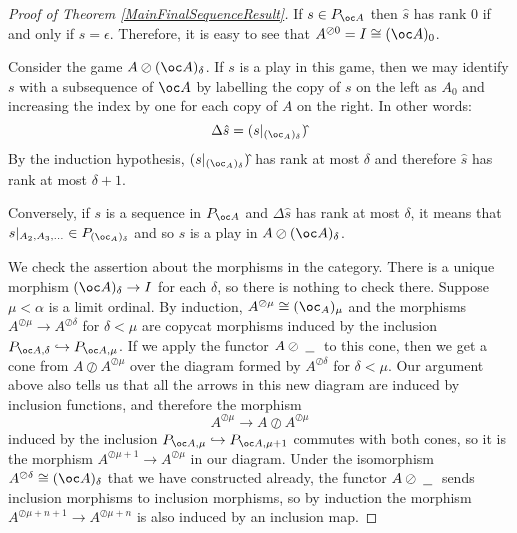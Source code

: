 \documentclass[11pt]{article} %
\theoremstyle{plain} %
\theoremstyle{definition} %
\theoremstyle{note}
\theoremstyle{exercisestyle}
\newcommand{\sequoid}{\oslash}
\newcommand{\emptyplay}{\epsilon}
\newcommand{\blank}{\;\underline{\hspace{1.5ex}}\;}
\begin{document}
\begin{proof}[Proof of Theorem \ref{MainFinalSequenceResult}]
  If $s\in P_{\oc A}$ then $\hat s$ has rank $0$ if and only if $s=\emptyplay$.  Therefore, it is easy to see that $A^{\sequoid 0}=I\cong(\oc A)_0$.  

  Consider the game $A\sequoid (\oc A)_\delta$.  If $s$ is a play in this game, then we may identify $s$ with a subsequence of $\oc A$ by labelling the copy of $s$ on the left as $A_0$ and increasing the index by one for each copy of $A$ on the right.  In other words:
  \[
    \Delta\hat s = ({s\vert_{(\oc_A)_\delta}})\hat{}
    \]
  By the induction hypothesis, $({s\vert_{(\oc_A)_\delta}})\hat{}$ has rank at most $\delta$ and therefore $\hat s$ has rank at most $\delta+1$.  

  Conversely, if $s$ is a sequence in $P_{\oc A}$ and $\Delta\hat s$ has rank at most $\delta$, it means that $s\vert_{A_2,A_3,\dots}\in P_{(\oc_A)_\delta}$ and so $s$ is a play in $A\sequoid(\oc A)_\delta$.  

  We check the assertion about the morphisms in the category.  There is a unique morphism $(\oc A)_\delta\to I$ for each $\delta$, so there is nothing to check there.  Suppose $\mu<\alpha$ is a limit ordinal.  By induction, $A^{\sequoid\mu}\cong (\oc_A)_\mu$ and the morphisms $A^{\sequoid\mu}\to A^{\sequoid\delta}$ for $\delta<\mu$ are copycat morphisms induced by the inclusion $P_{\oc A, \delta}\hookrightarrow P_{\oc A,\mu}$.  If we apply the functor $A\sequoid\blank$ to this cone, then we get a cone from $A\sequoid A^{\sequoid \mu}$ over the diagram formed by $A^{\sequoid\delta}$ for $\delta<\mu$.  Our argument above also tells us that all the arrows in this new diagram are induced by inclusion functions, and therefore the morphism
  \[
    A^{\sequoid\mu}\to A\sequoid A^{\sequoid\mu}
    \]
  induced by the inclusion $P_{\oc A,\mu}\hookrightarrow P_{\oc A, \mu+1}$ commutes with both cones, so it is the morphism $A^{\sequoid\mu+1}\to A^{\sequoid\mu}$ in our diagram.  Under the isomorphism $A^{\sequoid\delta}\cong (\oc A)_\delta$ that we have constructed already, the functor $A\sequoid\blank$ sends inclusion morphisms to inclusion morphisms, so by induction the morphism $A^{\sequoid\mu+n+1}\to A^{\sequoid\mu+n}$ is also induced by an inclusion map.  


\end{proof}
\end{document}
